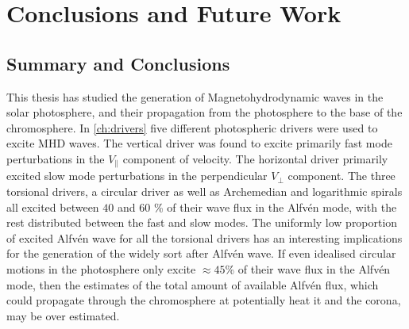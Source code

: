
\chapter{Conclusions and Future Work}\label{ch:conclusions}

\section{Summary and Conclusions}

This thesis has studied the generation of Magnetohydrodynamic waves in the solar photosphere, and their propagation from the photosphere to the base of the chromosphere.
In \cref{ch:drivers} five different photospheric drivers were used to excite MHD waves.
The vertical driver was found to excite primarily fast mode perturbations in the $V_\parallel$ component of velocity.
The horizontal driver primarily excited slow mode perturbations in the perpendicular $V_\perp$ component.
The three torsional drivers, a circular driver as well as Archemedian and logarithmic spirals all excited between $40$ and $60$ \% of their wave flux in the Alfv\'en mode, with the rest distributed between the fast and slow modes.
The uniformly low proportion of excited Alfv\'en wave for all the torsional drivers has an interesting implications for the generation of the widely sort after Alfv\'en wave.
If even idealised circular motions in the photosphere only excite $\approx 45$\% of their wave flux in the Alfv\'en mode, then the estimates of the total amount of available Alfv\'en flux, which could propagate through the chromosphere at potentially heat it and the corona, may be over estimated.

